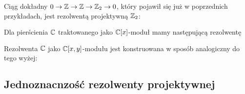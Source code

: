 \begin{example}
\item Ciąg dokładny $0\to \operatorname{\mathbb{Z}}\to \operatorname{\mathbb{Z}}\to \operatorname{\mathbb{Z}}_2\to 0$, który pojawił się już w poprzednich przykładach, jest rezolwentą projektywną $\operatorname{\mathbb{Z}}_2$:
  \begin{center}\end{center}
\item Dla pierścienia $\operatorname{\mathbb{C}}$ traktowanego jako $\operatorname{\mathbb{C}}[x]$-moduł mamy następującą rezolwentę
  \begin{center}\end{center}
\item Rezolwenta $\operatorname{\mathbb{C}}$ jako $\operatorname{\mathbb{C}}[x, y]$-modułu jest konstruowana w sposób analogiczny do tego wyżej:
  \begin{center}\end{center}
\end{example}

\subsection{Jednoznacnzość rezolwenty projektywnej} 

